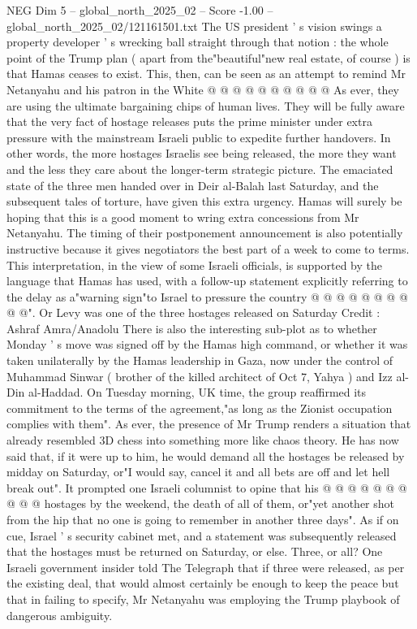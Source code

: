 \begin{textsample}{NEG Dim 5 – global\_north\_2025\_02 – Score -1.00 – global\_north\_2025\_02/121161501.txt}
The US president ' s vision swings a property developer ' s wrecking ball straight through that notion : the whole point of the Trump plan ( apart from the"beautiful"new real estate, of course ) is that Hamas ceases to exist.
This, then, can be seen as an attempt to remind Mr Netanyahu and his patron in the White @ @ @ @ @ @ @ @ @ @ As ever, they are using the ultimate bargaining chips of human lives.
They will be fully aware that the very fact of hostage releases puts the prime minister under extra pressure with the mainstream Israeli public to expedite further handovers.
In other words, the more hostages Israelis see being released, the more they want and the less they care about the longer-term strategic picture.
The emaciated state of the three men handed over in Deir al-Balah last Saturday, and the subsequent tales of torture, have given this extra urgency.
Hamas will surely be hoping that this is a good moment to wring extra concessions from Mr Netanyahu.
The timing of their postponement announcement is also potentially instructive because it gives negotiators the best part of a week to come to terms.
This interpretation, in the view of some Israeli officials, is supported by the language that Hamas has used, with a follow-up statement explicitly referring to the delay as a"warning sign"to Israel to pressure the country @ @ @ @ @ @ @ @ @ @".
Or Levy was one of the three hostages released on Saturday Credit : Ashraf Amra/Anadolu There is also the interesting sub-plot as to whether Monday ' s move was signed off by the Hamas high command, or whether it was taken unilaterally by the Hamas leadership in Gaza, now under the control of Muhammad Sinwar ( brother of the killed architect of Oct 7, Yahya ) and Izz al-Din al-Haddad.
On Tuesday morning, UK time, the group reaffirmed its commitment to the terms of the agreement,"as long as the Zionist occupation complies with them".
As ever, the presence of Mr Trump renders a situation that already resembled 3D chess into something more like chaos theory.
He has now said that, if it were up to him, he would demand all the hostages be released by midday on Saturday, or"I would say, cancel it and all bets are off and let hell break out".
It prompted one Israeli columnist to opine that his @ @ @ @ @ @ @ @ @ @ hostages by the weekend, the death of all of them, or"yet another shot from the hip that no one is going to remember in another three days".
As if on cue, Israel ' s security cabinet met, and a statement was subsequently released that the hostages must be returned on Saturday, or else.
Three, or all?
One Israeli government insider told The Telegraph that if three were released, as per the existing deal, that would almost certainly be enough to keep the peace but that in failing to specify, Mr Netanyahu was employing the Trump playbook of dangerous ambiguity.

\end{textsample}
